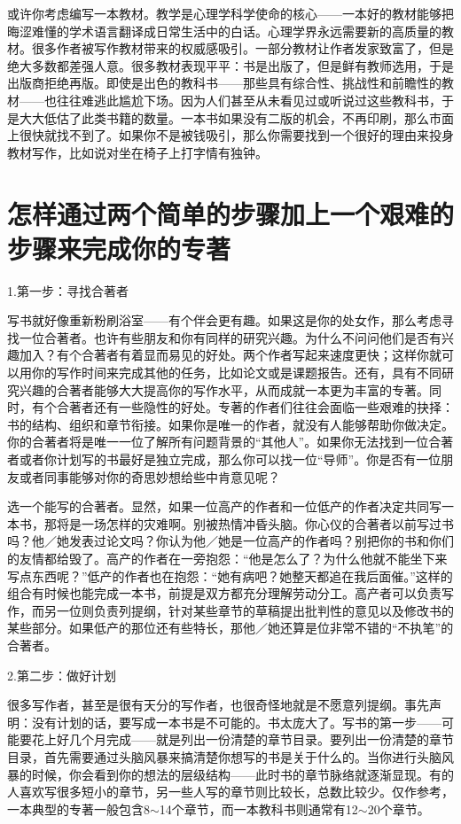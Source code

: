 或许你考虑编写一本教材。教学是心理学科学使命的核心——一本好的教材能够把晦涩难懂的学术语言翻译成日常生活中的白话。心理学界永远需要新的高质量的教材。很多作者被写作教材带来的权威感吸引。一部分教材让作者发家致富了，但是绝大多数都差强人意。很多教材表现平平：书是出版了，但是鲜有教师选用，于是出版商拒绝再版。即使是出色的教科书——那些具有综合性、挑战性和前瞻性的教材——也往往难逃此尴尬下场。因为人们甚至从未看见过或听说过这些教科书，于是大大低估了此类书籍的数量。一本书如果没有二版的机会，不再印刷，那么市面上很快就找不到了。如果你不是被钱吸引，那么你需要找到一个很好的理由来投身教材写作，比如说对坐在椅子上打字情有独钟。



\section{怎样通过两个简单的步骤加上一个艰难的步骤来完成你的专著}
{\kaishu 1.第一步：寻找合著者}

写书就好像重新粉刷浴室——有个伴会更有趣。如果这是你的处女作，那么考虑寻找一位合著者。也许有些朋友和你有同样的研究兴趣。为什么不问问他们是否有兴趣加入？有个合著者有着显而易见的好处。两个作者写起来速度更快；这样你就可以用你的写作时间来完成其他的任务，比如论文或是课题报告。还有，具有不同研究兴趣的合著者能够大大提高你的写作水平，从而成就一本更为丰富的专著。同时，有个合著者还有一些隐性的好处。专著的作者们往往会面临一些艰难的抉择：书的结构、组织和章节衔接。如果你是唯一的作者，就没有人能够帮助你做决定。你的合著者将是唯一一位了解所有问题背景的“其他人”。如果你无法找到一位合著者或者你计划写的书最好是独立完成，那么你可以找一位“导师”。你是否有一位朋友或者同事能够对你的奇思妙想给些中肯意见呢？

选一个能写的合著者。显然，如果一位高产的作者和一位低产的作者决定共同写一本书，那将是一场怎样的灾难啊。别被热情冲昏头脑。你心仪的合著者以前写过书吗？他／她发表过论文吗？你认为他／她是一位高产的作者吗？别把你的书和你们的友情都给毁了。高产的作者在一旁抱怨：“他是怎么了？为什么他就不能坐下来写点东西呢？”低产的作者也在抱怨：“她有病吧？她整天都追在我后面催。”这样的组合有时候也能完成一本书，前提是双方都充分理解劳动分工。高产者可以负责写作，而另一位则负责列提纲，针对某些章节的草稿提出批判性的意见以及修改书的某些部分。如果低产的那位还有些特长，那他／她还算是位非常不错的“不执笔”的合著者。

{\kaishu 2.第二步：做好计划}

很多写作者，甚至是很有天分的写作者，也很奇怪地就是不愿意列提纲。事先声明：没有计划的话，要写成一本书是不可能的。书太庞大了。写书的第一步——可能要花上好几个月完成——就是列出一份清楚的章节目录。要列出一份清楚的章节目录，首先需要通过头脑风暴来搞清楚你想写的书是关于什么的。当你进行头脑风暴的时候，你会看到你的想法的层级结构——此时书的章节脉络就逐渐显现。有的人喜欢写很多短小的章节，另一些人写的章节则比较长，总数比较少。仅作参考，一本典型的专著一般包含8$\sim$14个章节，而一本教科书则通常有12$\sim$20个章节。

